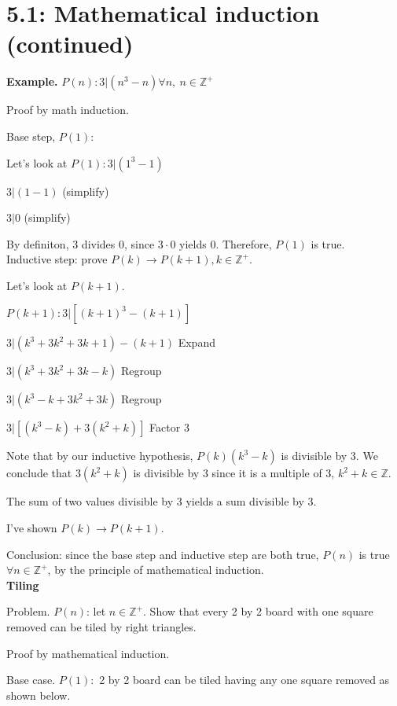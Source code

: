 \documentclass{exam}
\begin{document}
	
    \section{5.1: Mathematical induction (continued)}
    
    \textbf{Example.} $P(n): 3|(n^3 - n) \forall n,\ n \in \mathbb Z^+$
    
    Proof by math induction.
    
    Base step, $P(1)$:
    
    Let's look at $P(1): 3|(1^3 - 1)$
    
    $3|(1-1)$ (simplify)
    
    $3|0$ (simplify)
    
    By definiton, 3 divides 0, since $3 \cdot 0$ yields 0. Therefore, $P(1)$ is true.\\
    
    Inductive step: prove $P(k) \rightarrow P(k+1), k \in \mathbb Z^+$.
    
    Let's look at $P(k+1)$.
    
    $P(k+1) : 3|[(k+1)^3 - (k+1)]$
    
    $3|(k^3+3k^2+3k+1)-(k+1)$ Expand
    
    $3|(k^3 + 3k^2 + 3k - k)$ Regroup
    
    $3|(k^3 - k + 3k^2 + 3k)$ Regroup
    
    $3|[(k^3-k)+3(k^2+k)]$ Factor 3
    
    Note that by our inductive hypothesis, $P(k) (k^3-k)$ is divisible by 3. We conclude that $3(k^2+k)$ is divisible by 3 since it is a multiple of 3, $k^2 + k \in \mathbb Z$.
    
    The sum of two values divisible by 3 yields a sum divisible by 3.
    
    I've shown $P(k) \rightarrow P(k+1)$.
    
    Conclusion: since the base step and inductive step are both true, $P(n)$ is true $\forall n \in \mathbb Z^+$, by the principle of mathematical induction.\\
    
    {\large \textbf{Tiling}}
    
    Problem. $P(n)$: let $n \in \mathbb Z^+$. Show that every 2 by 2 board with one square removed can be tiled by right triangles.
    
    Proof by mathematical induction.
    
    Base case. $P(1): $ 2 by 2 board can be tiled having any one square removed as shown below.
    
\end{document}
